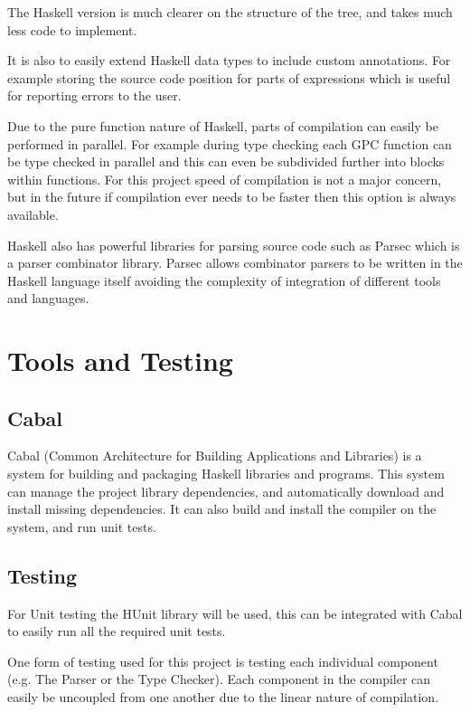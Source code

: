 The Haskell version is much clearer on the structure of the tree, and takes much
less code to implement. 

It is also to easily extend Haskell data types to include
custom annotations. For example storing the source code position for parts of expressions 
which is useful for reporting errors to the user.

Due to the pure function nature of Haskell, parts of compilation can easily be performed in parallel.
For example during type checking each GPC function can be type checked in parallel and this can even be subdivided 
further into blocks within functions. For this project speed of compilation is not a major concern, but in the future if compilation ever
needs to be faster then this option is always available.

Haskell also has powerful libraries for parsing source code such as Parsec which is a parser combinator
library. Parsec allows combinator parsers to be written in the Haskell language itself avoiding the complexity
of integration of different tools and languages\cite{parsec}. 

\section{Tools and Testing}


\subsection{Cabal}

Cabal (Common Architecture for Building Applications and Libraries) is a system for building and
packaging Haskell libraries and programs\cite{cabal}. This system can manage the
project library dependencies, and automatically download and install missing dependencies.
It can also build and install the compiler on the system, and run unit tests.

\subsection{Testing}

For Unit testing the HUnit\cite{hunit} library will be used, this can be integrated
with Cabal to easily run all the required unit tests.

One form of testing used for this project is testing each individual component
(e.g. The Parser or the Type Checker). Each component in the compiler can easily
be uncoupled from one another due to the linear nature of compilation.


